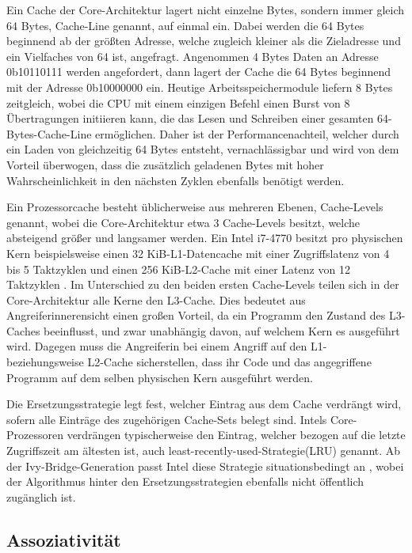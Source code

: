 Ein Cache der Core-Architektur lagert nicht einzelne Bytes, sondern immer gleich 64 Bytes, Cache-Line genannt, auf einmal ein. Dabei werden die 64 Bytes beginnend ab der größten Adresse, welche zugleich kleiner als die Zieladresse und ein Vielfaches von 64 ist, angefragt.
Angenommen 4 Bytes Daten an Adresse 0b10110111 werden angefordert, dann lagert der Cache die 64 Bytes beginnend mit der Adresse 0b10000000 ein.
Heutige Arbeitsspeichermodule liefern 8 Bytes zeitgleich, wobei die CPU mit einem einzigen Befehl einen Burst von 8 Übertragungen initiieren kann, die das Lesen und Schreiben einer gesamten 64-Bytes-Cache-Line ermöglichen.
Daher ist der Performancenachteil, welcher durch ein Laden von gleichzeitig 64 Bytes entsteht, vernachlässigbar und wird von dem Vorteil überwogen, dass die zusätzlich geladenen Bytes mit hoher Wahrscheinlichkeit in den nächsten Zyklen ebenfalls benötigt werden.

Ein Prozessorcache besteht üblicherweise aus mehreren Ebenen, Cache-Levels genannt, wobei die Core-Architektur etwa 3 Cache-Levels besitzt, welche absteigend größer und langsamer werden. Ein Intel i7-4770 besitzt pro physischen Kern beispielsweise einen 32 KiB-L1-Datencache mit einer Zugriffslatenz von 4 bis 5 Taktzyklen und einen 256 KiB-L2-Cache mit einer Latenz von 12 Taktzyklen \cite{CacheStatsHaswell}.
Im Unterschied zu den beiden ersten Cache-Levels teilen sich in der Core-Architektur alle Kerne den L3-Cache. 
Dies bedeutet aus Angreiferinnerensicht einen großen Vorteil, da ein Programm den Zustand des L3-Caches beeinflusst, und zwar unabhängig davon, auf welchem Kern es ausgeführt wird.
Dagegen muss die Angreiferin bei einem Angriff auf den L1- beziehungsweise L2-Cache sicherstellen, dass ihr Code und das angegriffene Programm auf dem selben physischen Kern ausgeführt werden.

Die Ersetzungsstrategie legt fest, welcher Eintrag aus dem Cache verdrängt wird, sofern alle Einträge des zugehörigen Cache-Sets belegt sind. 
Intels Core-Prozessoren verdrängen typischerweise den Eintrag, welcher bezogen auf die letzte Zugriffszeit am ältesten ist, auch least-recently-used-Strategie(LRU) genannt. 
Ab der Ivy-Bridge-Generation passt Intel diese Strategie situationsbedingt an \cite{CacheReplacementPolicy}, wobei der Algorithmus hinter den Ersetzungsstrategien ebenfalls nicht öffentlich zugänglich ist.

\subsection{Assoziativität}

